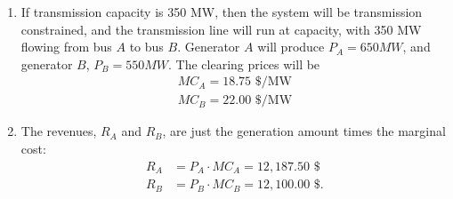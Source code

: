 \documentclass{homework}
\begin{document}
\begin{enumerate}
    the equilibrium price is:
    \begin{equation*}
        MC_A = MC_B = 20.14 \$ / \MW,
    \end{equation*}
    and power flow from bus $A$ to bus $B$ is
    \begin{equation*}
        P_{AB} = (742.86 - 300) \MW = (900 - 457.14) \MW = \boxed{442.86 \MW}
    \end{equation*}

    \item If transmission capacity is 350 MW, then the system will be transmission constrained, and the transmission line
    will run at capacity, with 350 MW flowing from bus $A$ to bus $B$.  Generator $A$ will produce $P_A = 650 MW$, and 
    generator $B$, $P_B = 550 MW$. The clearing prices will be
    \begin{align*}
        MC_A = 18.75 \text{ \$/MW} \\
        MC_B = 22.00 \text{ \$/MW}
    \end{align*}

    \item The revenues, $R_A$ and $R_B$, are just the generation amount times the marginal cost:
    \begin{align*}
        R_A &= P_A \cdot MC_A = 12,187.50 \text{ \$} \\
        R_B &= P_B \cdot MC_B = 12,100.00 \text{ \$}.
    \end{align*}



    


    
    





    
    
\end{enumerate}
\end{document}
